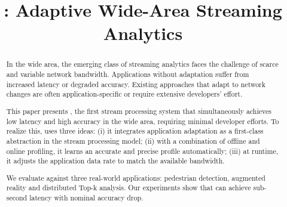 \documentclass[sigplan,10pt,anonymous]{acmart}\settopmatter{printfolios=true}
\begin{document}


\title{\sysname{}: Adaptive Wide-Area Streaming Analytics}

\begin{abstract}
  In the wide area, the emerging class of streaming analytics faces the
  challenge of scarce and variable network bandwidth. Applications without
  adaptation suffer from increased latency or degraded accuracy. Existing
  approaches that adapt to network changes are often application-specific or
  require extensive developers' effort.

  This paper presents \sysname{}, the first stream processing system that
  simultaneously achieves low latency and high accuracy in the wide area,
  requiring minimal developer efforts. To realize this, \sysname{} uses three
  ideas: (i) it integrates application adaptation as a first-class abstraction
  in the stream processing model; (ii) with a combination of offline and online
  profiling, it learns an accurate and precise profile automatically; (iii) at
  runtime, it adjusts the application data rate to match the available
  bandwidth.

  We evaluate \sysname{} against three real-world applications: pedestrian
  detection, augmented reality and distributed Top-k analysis. Our experiments
  show that \sysname{} can achieve sub-second latency with nominal accuracy
  drop.
\end{abstract}

\maketitle











\def \bibfont {\normalsize}

\end{document}
